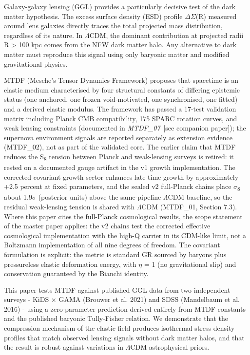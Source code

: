\documentclass[11pt,a4paper]{article}
\begin{document}
Galaxy-galaxy lensing (GGL) provides a particularly decisive test of the dark matter hypothesis. The excess surface density (ESD) profile $\Delta$$\Sigma$(R) measured around lens galaxies directly traces the total projected mass distribution, regardless of its nature. In $\Lambda$CDM, the dominant contribution at projected radii R > 100 kpc comes from the NFW dark matter halo. Any alternative to dark matter must reproduce this signal using only baryonic matter and modified gravitational physics.

MTDF (Mesche's Tensor Dynamics Framework) proposes that spacetime is an elastic medium characterised by four structural constants of differing epistemic status (one anchored, one frozen void-motivated, one synchronised, one fitted) and a derived elastic modulus. The framework has passed a 17-test validation matrix including Planck CMB compatibility, 175 SPARC rotation curves, and weak lensing constraints (documented in \textit{MTDF\_\allowbreak{}07}~[see companion paper]); the supernova environment signals are reported separately as extension evidence (MTDF\_\allowbreak{}02), not as part of the validated core. The earlier claim that MTDF reduces the S\textsubscript{8} tension between Planck and weak-lensing surveys is retired: it rested on a documented gauge artifact in the v1 growth implementation. The corrected covariant growth sector enhances late-time growth by approximately +2.5 percent at fixed parameters, and the sealed v2 full-Planck chains place $\sigma$\textsubscript{8} about 1.9$\sigma$ (posterior units) above the same-pipeline $\Lambda$CDM baseline, so the residual weak-lensing tension is shared with $\Lambda$CDM (MTDF\_\allowbreak{}01, Section 7.3). Where this paper cites the full-Planck cosmological results, the scope statement of the master paper applies: the v2 chains test the corrected effective cosmological implementation with the high-Q carrier in its CDM-like limit, not a Boltzmann implementation of all nine degrees of freedom. The covariant formulation is explicit: the metric is standard GR sourced by baryons plus pressureless elastic deformation energy, with $\eta$ = 1 (no gravitational slip) and conservation guaranteed by the Bianchi identity.

This paper tests MTDF against published GGL data from two independent surveys  -  KiDS $\times$ GAMA (Brouwer et al. 2021) and SDSS (Mandelbaum et al. 2016)  -  using a zero-parameter prediction derived entirely from MTDF constants and the published baryonic Tully-Fisher relation. We demonstrate that the compression mechanism of the elastic field produces isothermal stress density profiles that match observed lensing signals without dark matter halos, and that the result is robust against variations in $\Lambda$CDM astrophysical priors.
\end{document}
